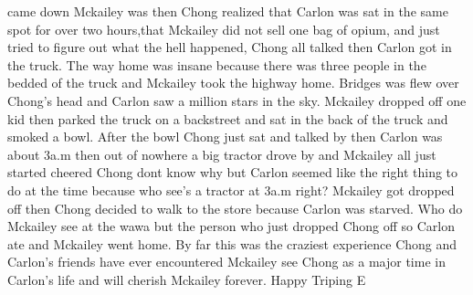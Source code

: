 \documentclass[12pt]{book}
\begin{document}
came down Mckailey was then Chong realized that Carlon was sat in the same spot for over two hours,that Mckailey did not sell one bag of opium, and just tried to figure out what the hell happened, Chong all talked then Carlon got in the truck. The way home was insane because there was three people in the bedded of the truck and Mckailey took the highway home. Bridges was flew over Chong's head and Carlon saw a million stars in the sky. Mckailey dropped off one kid then parked the truck on a backstreet and sat in the back of the truck and smoked a bowl. After the bowl Chong just sat and talked by then Carlon was about 3a.m then out of nowhere a big tractor drove by and Mckailey all just started cheered Chong dont know why but Carlon seemed like the right thing to do at the time because who see's a tractor at 3a.m right? Mckailey got dropped off then Chong decided to walk to the store because Carlon was starved. Who do Mckailey see at the wawa but the person who just dropped Chong off so Carlon ate and Mckailey went home. By far this was the craziest experience Chong and Carlon's friends have ever encountered Mckailey see Chong as a major time in Carlon's life and will cherish Mckailey forever. Happy Triping E
\end{document}
